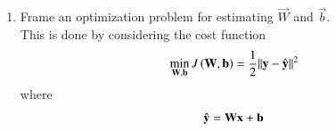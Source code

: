 \documentclass[journal,12pt,twocolumn]{IEEEtran}
\renewcommand\thesection{\arabic{section}}
\begin{document}
\begin{enumerate}[label=\thesection.\arabic*
,ref=\thesection.\theenumi]
%
where $\vec{W}$ is the weight matrix and $\vec{b}$ is the bias vector. Ideally, the output $\vec{y}$ should be one of the reference vectors in Table \ref{fig:ref_vec}.
\item Frame an optimization problem for estimating $\vec{W}$  and $\vec{b}$.
\\
\solution  This is done by considering the cost function 
\begin{equation}
\label{eq:cost}
\min_{\mathbf{W},\mathbf{b}} J\left(\mathbf{W},\mathbf{b}\right)  = \frac{1}{2}\lVert\mathbf{y}-\hat{\mathbf{y}}\rVert^2
\end{equation}
%
where
\begin{equation}
\hat{\mathbf{y}}= \mathbf{W}\mathbf{x}+\mathbf{b}
\end{equation}
%

\end{enumerate}
\end{document}

